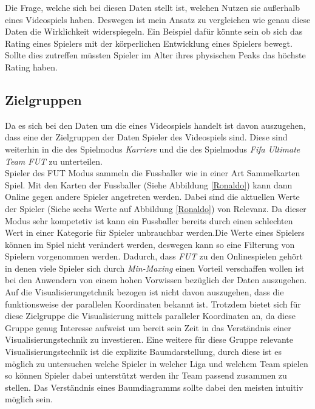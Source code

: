 \documentclass[usegeometry=true]{scrartcl}
\begin{document}
Die Frage, welche sich bei diesen Daten stellt ist, welchen Nutzen sie außerhalb eines Videospiels haben. Deswegen ist mein Ansatz zu vergleichen wie genau diese Daten die Wirklichkeit widerspiegeln. Ein Beispiel dafür könnte sein ob sich das Rating eines Spielers mit der körperlichen Entwicklung eines Spielers bewegt. Sollte dies zutreffen  müssten Spieler im Alter ihres physischen Peaks das höchste Rating haben. 
\subsection{Zielgruppen}
Da es sich bei den Daten um die eines Videospiels handelt ist davon auszugehen, dass eine der Zielgruppen der Daten Spieler des Videospiels sind. Diese sind weiterhin in die des Spielmodus \textit{Karriere} und die des Spielmodus \textit{Fifa Ultimate Team  FUT} zu unterteilen.\\


Spieler des FUT Modus sammeln die Fussballer wie in einer Art Sammelkarten Spiel. Mit den Karten der Fussballer (Siehe Abbildung \ref{Ronaldo}) kann dann Online gegen andere Spieler angetreten werden.
Dabei sind die aktuellen Werte der Spieler (Siehe sechs Werte auf Abbildung \ref{Ronaldo}) von Relevanz. Da dieser Modus sehr kompetetiv ist kann ein Fussballer bereits durch einen schlechten Wert in einer Kategorie für Spieler unbrauchbar werden.Die Werte eines Spielers können im Spiel nicht verändert werden, deswegen kann so eine Filterung von Spielern vorgenommen werden. Dadurch, dass \textit{FUT} zu den Onlinespielen gehört in denen viele Spieler sich durch \textit{Min-Maxing}\cite{noauthor_min-maxing_2014} einen Vorteil verschaffen wollen ist bei den Anwendern von einem hohen Vorwissen bezüglich der Daten auszugehen. Auf die Visualisierungetchnik bezogen ist nicht davon auszugehen, dass die funktionsweise der parallelen Koordinaten bekannt ist. Trotzdem bietet sich für diese Zielgruppe die Visualisierung mittels paralleler Koordinaten an, da diese Gruppe genug Interesse aufweist um bereit sein Zeit in das Verständnis einer Visualisierungstechnik zu investieren. Eine weitere für diese Gruppe relevante Visualisierungstechnik ist die explizite Baumdarstellung, durch diese ist es möglich zu untersuchen welche Spieler in welcher Liga und welchem Team spielen so können Spieler dabei unterstützt werden ihr Team passend zusammen zu stellen. Das Verständnis eines Baumdiagramms sollte dabei den meisten intuitiv möglich sein.\\
\end{document}
